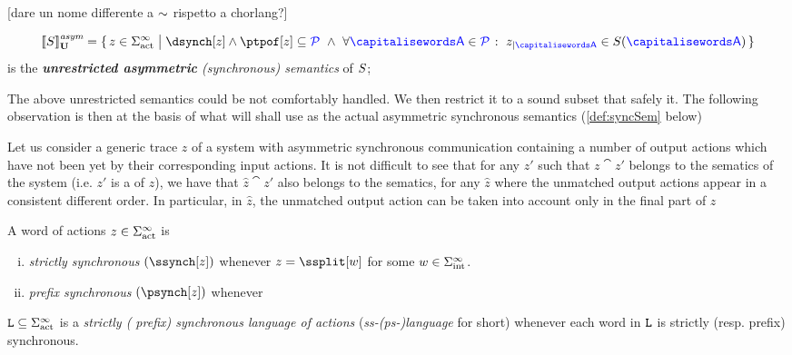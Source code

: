 [dare un nome differente a $\sim$ rispetto a chorlang?]

\begin{definition}
 \[
	 \gasem{\aCS} = \Set{z \in \alfact^\infty \sst \dsynch[z] \land\ptpof[z] \subseteq \ptpset \ \land\ \forall \p \in
		\ptpset \qst \filter{z}{\p} \in \aCS(\p)  }
  \]
  is the \emph{{\bf unrestricted asymmetric} (synchronous) semantics} of $S$;
\end{definition}

The above unrestricted semantics could be not comfortably handled.
We then restrict it to a sound subset that safely  it. 
The following observation is then at the basis of what will shall use as the 
actual asymmetric synchronous semantics (\cref{def:syncSem} below)

Let us consider a generic trace $z$ of a system with asymmetric synchronous communication 
containing a number of output actions which have not been  yet by their corresponding
input actions. It is not difficult to see that for any $z'$ such that
$z\cat z'$ belongs to the sematics of the system (i.e. $z'$ is a  of $z$), 
we have that $\hat z \cat z'$ also belongs to the sematics, for any $\hat z$ where the unmatched
output actions appear in a consistent different order.
In particular, in $\hat z$, the unmatched output action can be taken into account only in the final 
part of $z$ 


\begin{definition}[(prefix/strict) synchronous words]
%  
  A word of actions $z\in\Sigma_{\text{act}}^{\infty}$ is 
  \begin{enumerate}[i)]
  \item
  {\em strictly synchronous} $(\ssynch[z])$ whenever
   $z=\ssplit[w]$ for some $w\in\Sigma_{\text{int}}^\infty$.
  \item
  {\em prefix synchronous} $(\psynch[z])$ whenever
\end{enumerate}
  $\mathtt{L}\subseteq \Sigma_{\text{act}}^{\infty}$  is a \emph{strictly ({ prefix) synchronous} language
  of actions} (\emph{ss-(ps-)language} for short) whenever each word in $\mathtt{L}$ is strictly (resp. prefix) synchronous.
  \end{definition}
  
